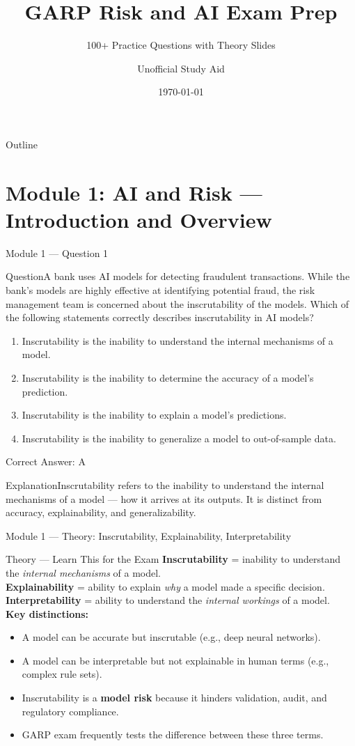 \documentclass[aspectratio=169,10pt]{beamer}
\title[GARP Risk \& AI]{GARP Risk and AI Exam Prep}
\subtitle{100+ Practice Questions with Theory Slides}
\author[Unofficial]{Unofficial Study Aid}
\institute[GARP Risk \& AI]{Based on the official GARP Risk and AI curriculum}
\date{\today}
\newcommand{\question}[1]{\begin{block}{Question}#1\end{block}}
\newcommand{\options}[4]{%
	\begin{enumerate}[label=\Alph*.,leftmargin=*]
		\item #1
		\item #2
		\item #3
		\item #4
	\end{enumerate}
}
\newcommand{\answerbox}[1]{\begin{exampleblock}{Correct Answer: #1}\end{exampleblock}}
\newcommand{\explain}[1]{\begin{block}{Explanation}#1\end{block}}
\newcommand{\theory}[1]{%
	\begin{block}{Theory --- Learn This for the Exam}
		\small #1
	\end{block}
}
\begin{document}
	
	\begin{frame}
		\titlepage
	\end{frame}
	
	\begin{frame}{Outline}
		\tableofcontents
	\end{frame}
	
	\section{Module 1: AI and Risk --- Introduction and Overview}
	
	\begin{frame}{Module 1 --- Question 1}
		\question{A bank uses AI models for detecting fraudulent transactions. While the bank's models are highly effective at identifying potential fraud, the risk management team is concerned about the inscrutability of the models. Which of the following statements correctly describes inscrutability in AI models?}
		\options{Inscrutability is the inability to understand the internal mechanisms of a model.}{Inscrutability is the inability to determine the accuracy of a model's prediction.}{Inscrutability is the inability to explain a model's predictions.}{Inscrutability is the inability to generalize a model to out-of-sample data.}
		\answerbox{A}
		\explain{Inscrutability refers to the inability to understand the internal mechanisms of a model --- how it arrives at its outputs. It is distinct from accuracy, explainability, and generalizability.}
	\end{frame}
	
	\begin{frame}{Module 1 --- Theory: Inscrutability, Explainability, Interpretability}
		\theory{
			\textbf{Inscrutability} = inability to understand the \emph{internal mechanisms} of a model.\\[2mm]
			\textbf{Explainability} = ability to explain \emph{why} a model made a specific decision.\\[2mm]
			\textbf{Interpretability} = ability to understand the \emph{internal workings} of a model.\\[2mm]
			\textbf{Key distinctions:}
			\begin{itemize}
				\item A model can be accurate but inscrutable (e.g., deep neural networks).
				\item A model can be interpretable but not explainable in human terms (e.g., complex rule sets).
				\item Inscrutability is a \textbf{model risk} because it hinders validation, audit, and regulatory compliance.
				\item GARP exam frequently tests the difference between these three terms.
			\end{itemize}
		}
	\end{frame}
	
\end{document}
